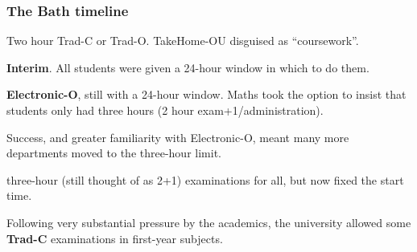 \begin{frame}[fragile]
\frametitle{The Bath timeline}
\pause
\begin{description}[<+->]
\item[Prior]Two hour Trad-C or Trad-O. TakeHome-OU disguised as ``coursework''.
\item[May 2020]{\bf Interim}. %
All students were given a 24-hour window in which to do them. 
\item[January 2021]{\bf Electronic-O},
still with a 24-hour window.  Maths took the option to insist that students only had three hours (2 hour exam+1/administration).
\item[May 2021] 
Success, and greater familiarity with Electronic-O, meant
many more departments moved to the three-hour limit.
\item[January 2022] 
three-hour (still thought of as 2+1) examinations for all, but now fixed the start time.
\item[May 2022] Following very substantial pressure by the academics, the university allowed some {\bf Trad-C} examinations in first-year subjects.
\end{description}
\end{frame}
